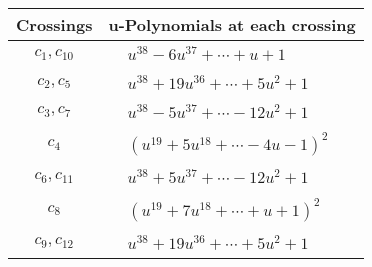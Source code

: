 \documentclass[1p]{elsarticle_modified}
\theoremstyle{definition}
\begin{document}
\begin{tabular}{m{50pt}|m{274pt}}
Crossings & \hspace{64pt}u-Polynomials at each crossing \\
\hline $$\begin{aligned}c_{1},c_{10}\end{aligned}$$&$\begin{aligned}
&u^{38}-6 u^{37}+\cdots+u+1
\end{aligned}$\\
\hline $$\begin{aligned}c_{2},c_{5}\end{aligned}$$&$\begin{aligned}
&u^{38}+19 u^{36}+\cdots+5 u^2+1
\end{aligned}$\\
\hline $$\begin{aligned}c_{3},c_{7}\end{aligned}$$&$\begin{aligned}
&u^{38}-5 u^{37}+\cdots-12 u^2+1
\end{aligned}$\\
\hline $$\begin{aligned}c_{4}\end{aligned}$$&$\begin{aligned}
&(u^{19}+5 u^{18}+\cdots-4 u-1)^{2}
\end{aligned}$\\
\hline $$\begin{aligned}c_{6},c_{11}\end{aligned}$$&$\begin{aligned}
&u^{38}+5 u^{37}+\cdots-12 u^2+1
\end{aligned}$\\
\hline $$\begin{aligned}c_{8}\end{aligned}$$&$\begin{aligned}
&(u^{19}+7 u^{18}+\cdots+u+1)^{2}
\end{aligned}$\\
\hline $$\begin{aligned}c_{9},c_{12}\end{aligned}$$&$\begin{aligned}
&u^{38}+19 u^{36}+\cdots+5 u^2+1
\end{aligned}$\\
\hline
\end{tabular}\\~\\
\newpage\renewcommand{\arraystretch}{1}
\end{document}
